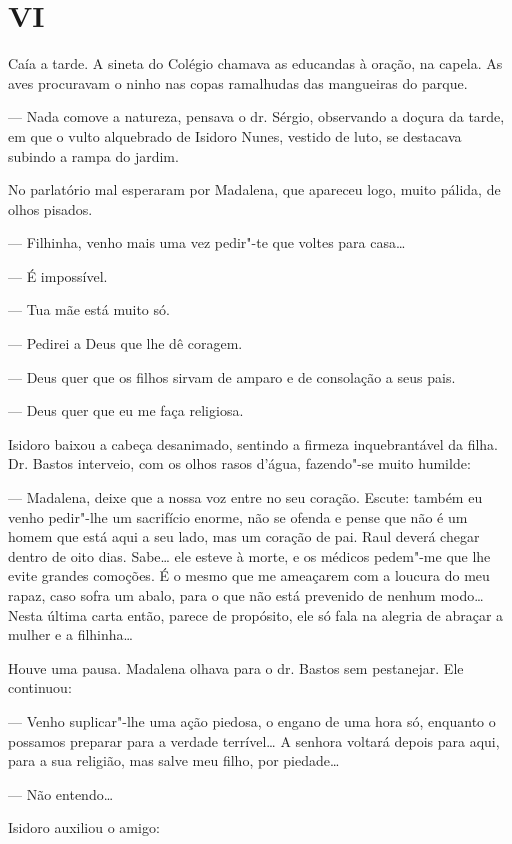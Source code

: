 \section{VI}

Caía a tarde. A sineta do Colégio chamava as educandas à oração, na
capela. As aves procuravam o ninho nas copas ramalhudas das mangueiras
do parque.

--- Nada comove a natureza, pensava o dr. Sérgio, observando a doçura da
tarde, em que o vulto alquebrado de Isidoro Nunes, vestido de luto, se
destacava subindo a rampa do jardim.

No parlatório mal esperaram por Madalena, que apareceu logo, muito
pálida, de olhos pisados.

--- Filhinha, venho mais uma vez pedir"-te que voltes para casa\ldots{}

--- É impossível.

--- Tua mãe está muito só.

--- Pedirei a Deus que lhe dê coragem.

--- Deus quer que os filhos sirvam de amparo e de consolação a seus
pais.

--- Deus quer que eu me faça religiosa.

Isidoro baixou a cabeça desanimado, sentindo a firmeza inquebrantável da
filha. Dr. Bastos interveio, com os olhos rasos d'água, fazendo"-se muito
humilde:

--- Madalena, deixe que a nossa voz entre no seu coração. Escute: também
eu venho pedir"-lhe um sacrifício enorme, não se ofenda e pense que não é
um homem que está aqui a seu lado, mas um coração de pai. Raul deverá
chegar dentro de oito dias. Sabe\ldots{} ele esteve à morte, e os médicos
pedem"-me que lhe evite grandes comoções. É o mesmo que me ameaçarem com
a loucura do meu rapaz, caso sofra um abalo, para o que não está
prevenido de nenhum modo\ldots{} Nesta última carta então, parece de
propósito, ele só fala na alegria de abraçar a mulher e a filhinha\ldots{}

Houve uma pausa. Madalena olhava para o dr. Bastos sem pestanejar. Ele
continuou:

--- Venho suplicar"-lhe uma ação piedosa, o engano de uma hora só,
enquanto o possamos preparar para a verdade terrível\ldots{} A senhora
voltará depois para aqui, para a sua religião, mas salve meu filho, por
piedade\ldots{}

--- Não entendo\ldots{}

Isidoro auxiliou o amigo:

